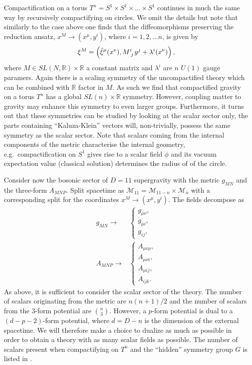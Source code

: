 Compactification on a torus $T^n=S^1\times S^1\times\ldots\times S^1$ continues in much the same way by recursively compactifying on circles. We omit the details but note that similarly to the case above one finds that the diffeomorphisms preserving the reduction ansatz, $x^M\to (x^\mu,y^i)$, where $i=1,2,\ldots n$, is given by 
\begin{equation}
    \xi^M = \left(\hat{\xi}^\mu(x^\nu),\tensor{M}{^i_j}y^j+\lambda^i(x^\nu)\right),
\end{equation}
where $M\in SL(N,\mathbb{R})\times \mathbb{R}$ a constant matrix and $\lambda^i$ are $n$ $U(1)$ gauge paramers. Again there is a scaling symmetry of the uncompactified theory which can be combined with $\mathbb{R}$ factor in $M$. As such we find that compactified gravity on a torus $T^n$ has a global $SL(n)\times\mathbb{R}$ symmetry. However, coupling matter to gravity may enhance this symmetry to even larger groups. Furthermore, it turns out that these symmetries can be studied by looking at the scalar sector only, the parts containing ``Kaluza-Klein'' vectors will, non-trivially, possess the same symmetry as the scalar sector. Note that scalars coming from the internal components of the metric characterise the internal geometry, e.g.\ compactification on $S^1$ gives rise to a scalar field $\phi$ and its vacuum expectation value (classical solution) determines the radius of of the circle.

Consider now the bosonic sector of $D=11$ supergravity with the metric $g_{MN}$ and the three-form $A_{MNP}$. Split spacetime as $\mathcal{M}_{11}=\mathcal{M}_{11-n}\times\mathcal{M}_n$ with a corresponding split for the coordinates $x^M\to (x^\mu,y^i)$. The fields decompose as 
\begin{align}
        g_{MN}\to &\begin{cases}g_{\mu\nu},\\g_{\mu i},\\g_{ij},\end{cases}\\
        A_{MNP}\to &\begin{cases}A_{\mu\nu\rho},\\A_{\mu\nu i},\\A_{\mu ij},\\A_{ijk}.\end{cases}
\end{align}
As above, it is sufficient to consider the scalar sector of the theory. The number of scalars originating from the metric are $n(n+1)/2$ and the number of scalars from the $3$-form potential are ${n}\choose{3}$. However, a $p$-form potential is dual to a $(d-p-2)$-form potential, where $d=D-n$ is the dimension of the external spacetime. We will therefore make a choice to dualize as much as possible in order to obtain a theory with as many scalar fields as possible. The number of scalars present when compactifying on $T^n$ and the ``hidden'' symmetry group $G$ is listed in .

